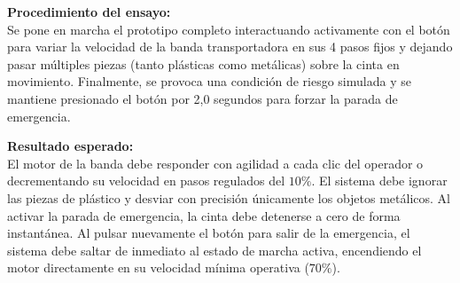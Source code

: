 \documentclass[12pt, letterpaper]{article}
\begin{document}
\vspace{0.5cm}

\noindent \textbf{Procedimiento del ensayo:} \\

Se pone en marcha el prototipo completo interactuando activamente con el botón para variar la velocidad de la banda transportadora en sus 4 pasos fijos y dejando pasar múltiples piezas (tanto plásticas como metálicas) sobre la cinta en movimiento. Finalmente, se provoca una condición de riesgo simulada y se mantiene presionado el botón por 2,0 segundos para forzar la parada de emergencia.

\vspace{0.5cm}

\noindent \textbf{Resultado esperado:} \\

El motor de la banda debe responder con agilidad a cada clic del operador  o decrementando su velocidad en pasos regulados del $10\%$. El sistema debe ignorar las piezas de plástico y desviar con precisión únicamente los objetos metálicos. Al activar la parada de emergencia, la cinta debe detenerse a cero de forma instantánea. Al pulsar nuevamente el botón para salir de la emergencia, el sistema debe saltar de inmediato al estado de marcha activa, encendiendo el motor directamente en su velocidad mínima operativa ($70\%$).
\end{document}
